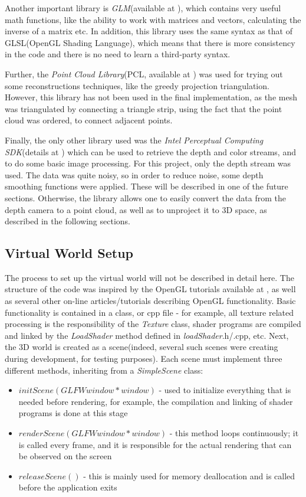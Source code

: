 \documentclass[]{article}
\begin{document}
Another important library is \textit{GLM}(available at \cite{GLM}), which contains very useful math functions, like the ability to work with matrices and vectors, calculating the inverse of a matrix etc. In addition, this library uses the same syntax as that of GLSL(OpenGL Shading Language), which means that there is more consistency in the code and there is no need to learn a third-party syntax.

Further, the \textit{Point Cloud Library}(PCL, available at \cite{PCL}) was used for trying out some reconstructions techniques, like the greedy projection triangulation. However, this library has not been used in the final implementation, as the mesh was triangulated by connecting a triangle strip, using the fact that the point cloud was ordered, to connect adjacent points.

Finally, the only other library used was the \textit{Intel Perceptual Computing SDK}(details at \cite{PCSDK}) which can be used to retrieve the depth and color streams, and to do some basic image processing. For this project, only the depth stream was used. The data was quite noisy, so in order to reduce noise, some depth smoothing functions were applied. These will be described in one of the future sections. Otherwise, the library allows one to easily convert the data from the depth camera to a point cloud, as well as to unproject it to 3D space, as described in the following sections.

\subsection{Virtual World Setup}


The process to set up the virtual world will not be described in detail here. The structure of the code was inspired by the OpenGL tutorials available at \cite{OpenGLTuts}, as well as several other on-line articles/tutorials describing OpenGL functionality. Basic functionality is contained in a class, or cpp file - for example, all texture related processing is the responsibility of the \textit{Texture} class, shader programs are compiled and linked by the \textit{LoadShader} method defined in \textit{loadShader}.h/.cpp, etc. Next, the 3D world is created as a scene(indeed, several such scenes were creating during development, for testing purposes). Each scene must implement three different methods, inheriting from a \textit{SimpleScene} class:
\begin{itemize}
\item $initScene(GLFWwindow *window)$ - used to initialize everything that is needed before rendering, for example, the compilation and linking of shader programs is done at this stage
\item $renderScene(GLFWwindow *window)$ - this method loops continuously; it is called every frame, and it is responsible for the actual rendering that can be observed on the screen
\item $releaseScene()$ - this is mainly used for memory deallocation and is called before the application exits
\end{itemize}
\end{document}

